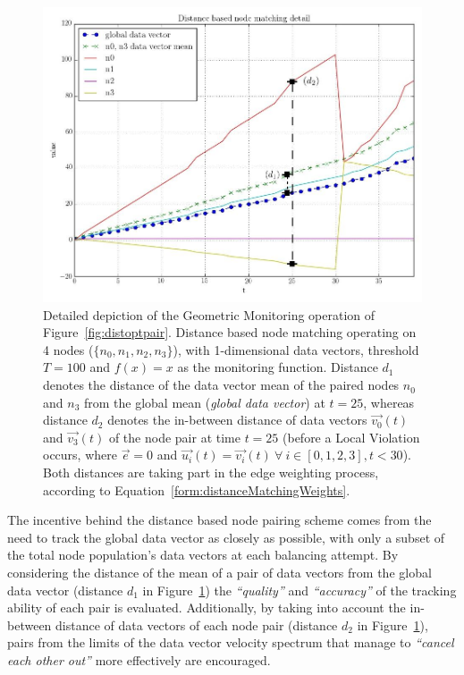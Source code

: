 \begin{figure}
        \centering
		\includegraphics[scale=0.30]{img/distoptpair_example_detail_edited.jpeg}
        \caption{Detailed depiction of the Geometric Monitoring operation of Figure~\ref{fig:distoptpair}. Distance based node matching operating on 4 nodes ($\{n_0, n_1, n_2, n_3\}$), with 1-dimensional data vectors, threshold $T=100$ and $f(x)=x$ as the monitoring function. Distance $d_1$ denotes the distance of the data vector mean of the paired nodes $n_0$ and $n_3$ from the global mean (\emph{global data vector}) at $t=25$, whereas distance $d_2$ denotes the in-between distance of data vectors $\vec{v_0}(t)$ and $\vec{v_3}(t)$ of the node pair at time $t=25$ (before a Local Violation occurs, where $\vec{e}=0$ and $\vec{u_i}(t)=\vec{v_i}(t)\ \forall\ i\in[0,1,2,3], t<30$). Both distances are taking part in the edge weighting process, according to Equation~\ref{form:distanceMatchingWeights}.} \label{fig:distoptpairdetailed}
\end{figure}%

The incentive behind the distance based node pairing scheme comes from the need to track the global data vector as closely as possible, with only a subset of the total node population's data vectors at each balancing attempt. By considering the distance of the mean of a pair of data vectors from the global data vector (distance $d_1$ in Figure~\ref{fig:distoptpairdetailed}) the \emph{``quality''} and \emph{``accuracy''} of the tracking ability of each pair is evaluated. Additionally, by taking into account the in-between distance of data vectors of each node pair (distance $d_2$ in Figure~\ref{fig:distoptpairdetailed}), pairs from the limits of the data vector velocity spectrum that manage to \emph{``cancel each other out''} more effectively are encouraged.

